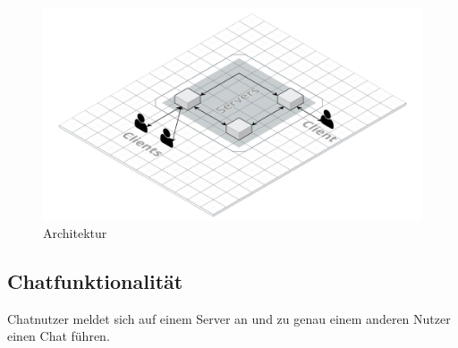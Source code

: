 





\begin{figure}[h]
    \centering
    \includegraphics[width=\textwidth]{architecture.png}
    
    \caption{Architektur}
    \label{}
\end{figure}

\subsection{Chatfunktionalität}

Chatnutzer meldet sich auf einem Server an und zu genau einem anderen Nutzer einen Chat führen.


